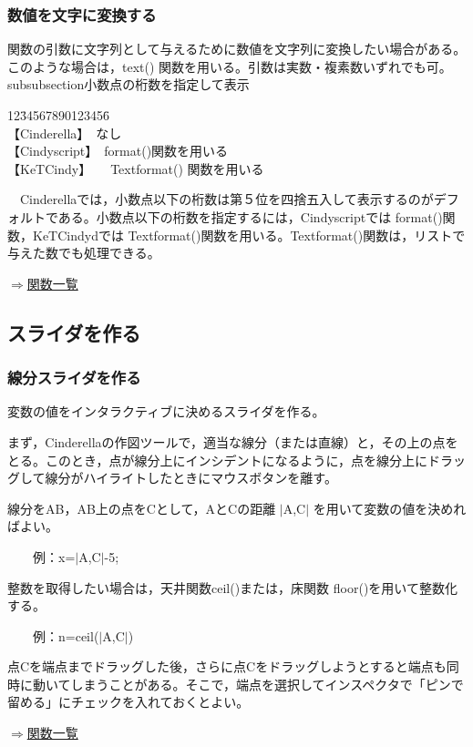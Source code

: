 \documentclass[papersize,a4paper,12pt,uplatex]{jsarticle}
\begin{document}
\subsubsection{数値を文字に変換する}
関数の引数に文字列として与えるために数値を文字列に変換したい場合がある。このような場合は，text() 関数を用いる。引数は実数・複素数いずれでも可。\\

subsubsection{小数点の桁数を指定して表示}
\begin{tabbing}
12\=34567890123456\=\kill\\

\>【Cinderella】　\>なし　\\ 
\>【Cindyscript】　\>format()関数を用いる　\\
 \>【KeTCindy】　　\>Textformat() 関数を用いる\\
\end{tabbing}
　Cinderellaでは，小数点以下の桁数は第５位を四捨五入して表示するのがデフォルトである。小数点以下の桁数を指定するには，Cindyscriptでは format()関数，KeTCindydでは Textformat()関数を用いる。Textformat()関数は，リストで与えた数でも処理できる。\\
\begin{flushright} \hyperlink{functionlist3d}{$\Rightarrow$関数一覧}\end{flushright}

\subsection{スライダを作る}
\subsubsection{線分スライダを作る}
変数の値をインタラクティブに決めるスライダを作る。

まず，Cinderellaの作図ツールで，適当な線分（または直線）と，その上の点をとる。このとき，点が線分上にインシデントになるように，点を線分上にドラッグして線分がハイライトしたときにマウスボタンを離す。

線分をAB，AB上の点をCとして，AとCの距離 $|$A,C$|$ を用いて変数の値を決めればよい。

　　例：x=$|$A,C$|$-5;

整数を取得したい場合は，天井関数ceil()または，床関数 floor()を用いて整数化する。

　　例：n=ceil($|$A,C$|$)

点Cを端点までドラッグした後，さらに点Cをドラッグしようとすると端点も同時に動いてしまうことがある。そこで，端点を選択してインスペクタで「ピンで留める」にチェックを入れておくとよい。
\begin{flushright} \hyperlink{functionlist3d}{$\Rightarrow$関数一覧}\end{flushright}
\end{document}
